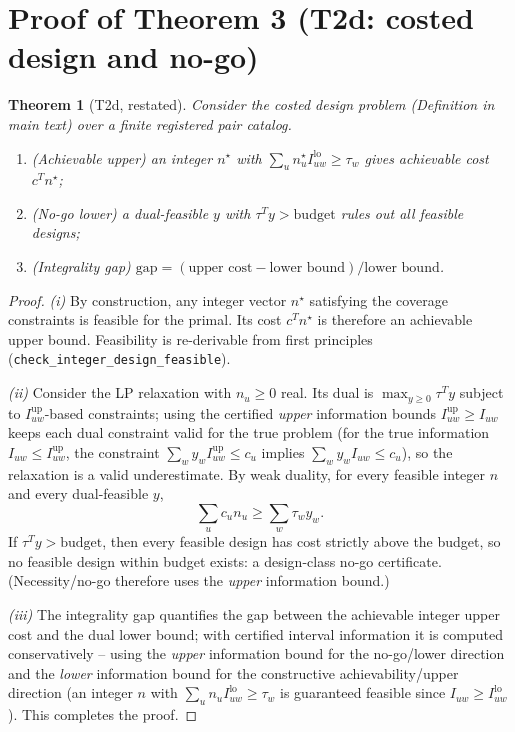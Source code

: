 \documentclass[11pt]{article}
\newtheorem{theorem}{Theorem}
\begin{document}
\section{Proof of Theorem 3 (T2d: costed design and no-go)}\label{sec:proof-t2d}

\begin{theorem}[T2d, restated]
Consider the costed design problem (Definition in main text) over a finite registered pair catalog.
\begin{enumerate}
  \item (Achievable upper) an integer $n^\star$ with $\sum_u n^\star_u I_{uw}^{\mathrm{lo}}\ge\tau_w$
        gives achievable cost $c^Tn^\star$;
  \item (No-go lower) a dual-feasible $y$ with $\tau^Ty>\mathrm{budget}$ rules out all feasible designs;
  \item (Integrality gap) $\mathrm{gap}=(\text{upper cost}-\text{lower bound})/\text{lower bound}$.
\end{enumerate}
\end{theorem}

\begin{proof}
\emph{(i)} By construction, any integer vector $n^\star$ satisfying the coverage constraints is feasible
for the primal. Its cost $c^Tn^\star$ is therefore an achievable upper bound. Feasibility is re-derivable
from first principles (\texttt{check\_integer\_design\_feasible}).

\emph{(ii)} Consider the LP relaxation with $n_u\ge0$ real. Its dual is
$\max_{y\ge0}\tau^Ty$ subject to $I_{uw}^{\mathrm{up}}$-based constraints; using the certified
\emph{upper} information bounds $I_{uw}^{\mathrm{up}}\ge I_{uw}$ keeps each dual constraint valid for the
true problem (for the true information $I_{uw}\le I_{uw}^{\mathrm{up}}$, the constraint
$\sum_w y_w I_{uw}^{\mathrm{up}}\le c_u$ implies $\sum_w y_w I_{uw}\le c_u$), so the relaxation is a
valid underestimate. By weak duality, for every feasible integer $n$ and every dual-feasible $y$,
\[
\sum_u c_u n_u \ge \sum_w \tau_w y_w.
\]
If $\tau^Ty>\mathrm{budget}$, then every feasible design has cost strictly above the budget, so no
feasible design within budget exists: a design-class no-go certificate.  (Necessity/no-go therefore uses
the \emph{upper} information bound.)

\emph{(iii)} The integrality gap quantifies the gap between the achievable integer upper cost and the
dual lower bound; with certified interval information it is computed conservatively -- using the
\emph{upper} information bound for the no-go/lower direction and the \emph{lower} information bound for
the constructive achievability/upper direction (an integer $n$ with $\sum_u n_u I_{uw}^{\mathrm{lo}}
\ge\tau_w$ is guaranteed feasible since $I_{uw}\ge I_{uw}^{\mathrm{lo}}$). This completes the proof.
\end{proof}
\end{document}

